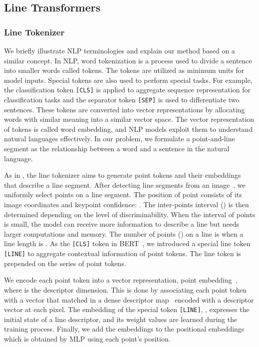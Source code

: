 \documentclass[letterpaper, 10 pt, journal, twoside]{ieeetran}
\begin{document}
\subsection{Line Transformers}

\subsubsection{Line Tokenizer}

We briefly illustrate \ac{NLP} terminologies and explain our method based on a similar concept. In \ac{NLP}, word tokenization is a process used to divide a sentence into smaller words called tokens. The tokens are utilized as minimum units for model inputs. Special tokens are also used to perform special tasks. For example, the classification token \texttt{[CLS]} is applied to aggregate sequence representation for classification tasks and the separator token \texttt{[SEP]} is used to differentiate two sentences. These tokens are converted into vector representations by allocating words with similar meaning into a similar vector space. The vector representation of tokens is called word embedding, and \ac{NLP} models exploit them to understand natural languages effectively. In our problem, we formulate a point-and-line segment as the relationship between a word and a sentence in the natural language.

As in , the line tokenizer aims to generate point tokens and their embeddings that describe a line segment. After detecting line segments from an image~\cite{Gioi2010}, we uniformly select points  on a line segment. The position of point  consists of its image coordinates and keypoint confidence: . The inter-points interval () is then determined depending on the level of discriminability. When the interval of points is small, the model can receive more information to describe a line but needs larger computations and memory. The number of points () on a line is  when a line length is . As the \texttt{[CLS]} token in BERT~\cite{Devlin2018}, we introduced a special line token \texttt{[LINE]} to aggregate contextual information of point tokens. The line token is prepended on the series of point tokens.

We encode each point token into a vector representation, point embedding~, where  is the descriptor dimension. This is done by associating each point token with a vector that matched in a dense descriptor map~\cite{DeTone2017} encoded with a descriptor vector at each pixel. The embedding of the special token \texttt{[LINE]}, , expresses the initial state of a line descriptor, and its weight values are learned during the training process. Finally, we add the embeddings to the positional embeddings~ which is obtained by \ac{MLP} using each point's position.
\end{document}

